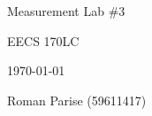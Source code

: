 \centering
\vspace*{5cm}
{\huge Measurement Lab \#3 \par}
{\Large EECS 170LC \par}
{\Large \today \par}
\vspace{1cm}
{\large Roman Parise (59611417) \par}
\vspace{1cm}
